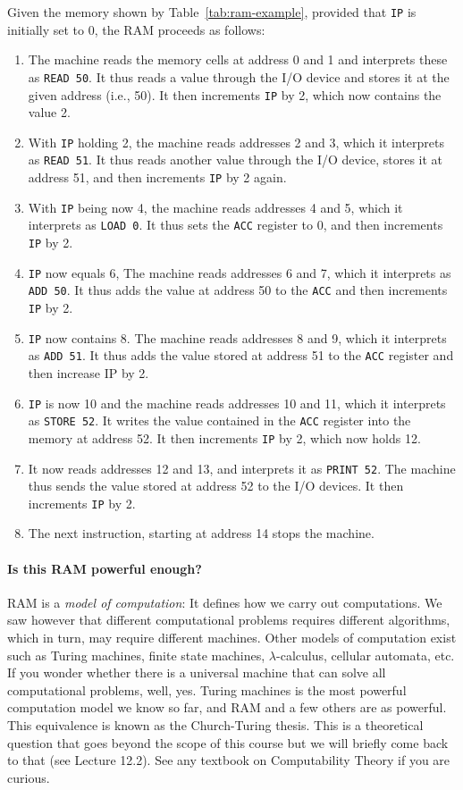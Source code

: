 \documentclass {aldast}
\begin{document}
Given the memory shown by Table~\ref{tab:ram-example}, provided that
\texttt{IP} is initially set to 0, the RAM proceeds as follows:
\begin{enumerate}
\item The machine reads the memory cells at address 0 and 1 and
  interprets these as \texttt{READ 50}. It thus reads a value through
  the I/O device and stores it at the given address (i.e., 50). It
  then increments \texttt{IP} by 2, which now contains the value 2.
\item With \texttt{IP} holding 2, the machine reads addresses 2 and
  3, which it interprets as \texttt{READ 51}. It thus reads another
  value through the I/O device, stores it at address 51, and then
  increments \texttt{IP} by 2 again.
\item With \texttt{IP} being now 4, the machine reads addresses 4 and
  5, which it interprets as \texttt{LOAD 0}. It thus sets the
  \texttt{ACC} register to 0, and then increments \texttt{IP} by 2.
\item \texttt{IP} now equals 6, The machine reads addresses 6 and
  7, which it interprets as \texttt{ADD 50}. It thus adds the value at
  address 50 to the \texttt{ACC} and then increments \texttt{IP} by 2.
\item \texttt{IP} now contains 8. The machine reads addresses 8 and 9,
  which it interprets as \texttt{ADD 51}. It thus adds the value
  stored at address 51 to the \texttt{ACC} register and then increase
  IP by 2.
\item \texttt{IP} is now 10 and the machine reads addresses 10 and 11,
  which it interprets as \texttt{STORE 52}. It writes the value
  contained in the \texttt{ACC} register into the memory at address
  52. It then increments \texttt{IP} by 2, which now holds 12.
\item It now reads addresses 12 and 13, and interprets it as
  \texttt{PRINT 52}. The machine thus sends the value stored at
  address 52 to the I/O devices. It then increments \texttt{IP} by 2.
\item The next instruction, starting at address 14 stops the machine.
\end{enumerate}

\paragraph{Is this RAM powerful enough?} RAM is a \emph{model of
  computation}: It defines how we carry out computations. We saw
however that different computational problems requires different
algorithms, which in turn, may require different machines. Other
models of computation exist such as Turing machines, finite state
machines, $\lambda$-calculus, cellular automata, etc. If you wonder
whether there is a universal machine that can solve all computational
problems, well, yes. Turing machines is the most powerful computation
model we know so far, and RAM and a few others are as powerful. This
equivalence is known as the Church-Turing thesis. This is a
theoretical question that goes beyond the scope of this course but we
will briefly come back to that (see Lecture 12.2). See any textbook on
Computability Theory \cite{fernandez2009} if you are curious.
\end{document}
